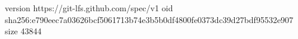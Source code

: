 version https://git-lfs.github.com/spec/v1
oid sha256:e790eec7a03626bcf5061713b74e3b5b0df4800fe0373dc39d27bdf95532e907
size 43844
